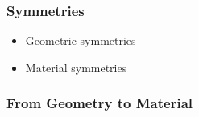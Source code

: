 \documentclass[serif,mathserif, 12pt]{beamer}
\begin{document}
\begin{frame}
  \frametitle{Symmetries}
  \begin{itemize}
  \item Geometric symmetries
  \item Material symmetries
  \end{itemize}
\end{frame}

\begin{frame}
  \frametitle{From Geometry to Material}
\end{frame}

\begin{frame} 
\end{frame}
\end{document}
